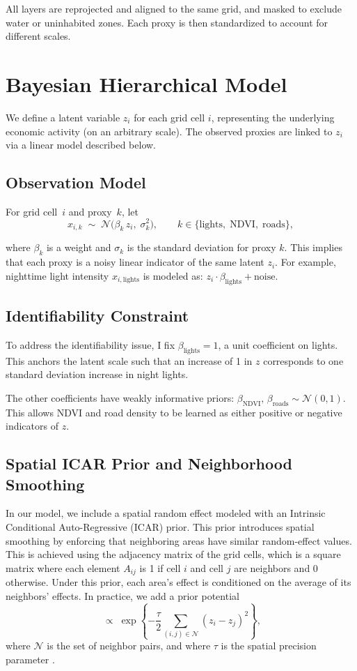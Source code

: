 \documentclass[12pt]{article}
\begin{document}
All layers are reprojected and aligned to the same grid, and masked to exclude water or uninhabited zones. Each proxy is then standardized to account for different scales.

\section{Bayesian Hierarchical Model}
\label{sec:model}

We define a latent variable $z_i$ for each grid cell $i$, representing the underlying economic activity (on an arbitrary scale). The observed proxies are linked to $z_i$ via a linear model described below.

\subsection{Observation Model}
For grid cell~$i$ and proxy~$k$, let 
\[
x_{i,k} \;\sim\; \mathcal{N}\!\bigl(\beta_k\,z_i,\;\sigma_k^2\bigr),
\qquad
k \in \{\text{lights},\;\text{NDVI},\;\text{roads}\},
\]

where $\beta_k$ is a weight and $\sigma_k$ is the standard deviation for proxy $k$. This implies that each proxy is a noisy linear indicator of the same latent $z_i$. For example, nighttime light intensity $x_{i,\text{lights}}$ is modeled as: $z_i \cdot \beta_{\text{lights}} + \text{noise}$.

\subsection{Identifiability Constraint}
To address the identifiability issue, I fix $\beta_{\text{lights}}=1$, a unit coefficient on lights. This anchors the latent scale such that an increase of 1 in $z$ corresponds to one standard deviation increase in night lights. 

The other coefficients have weakly informative priors: $\beta_{\text{NDVI}},\,\beta_{\text{roads}} \sim \mathcal N(0,1)$. This allows NDVI and road density to be learned as either positive or negative indicators of $z$. 


\subsection{Spatial ICAR Prior and Neighborhood Smoothing}

In our model, we include a spatial random effect modeled with an Intrinsic Conditional Auto-Regressive (ICAR) prior. This prior introduces spatial smoothing by enforcing that neighboring areas have similar random-effect values. This is achieved using the adjacency matrix of the grid cells, which is a square matrix where each element $A_{ij}$ is 1 if cell $i$ and cell $j$ are neighbors and 0 otherwise. Under this prior, each area's effect is conditioned on the average of its neighbors' effects. In practice, we add a prior potential
\[
\;\propto\;
\exp\!\left\{-\frac{\tau}{2}\sum_{(i,j)\in\mathcal N}(z_i-z_j)^2\right\},
\]
where $\mathcal N$ is the set of neighbor pairs, and where $\tau$ is the spatial precision parameter \parencite{duncan2017spatial}. 
\end{document}
